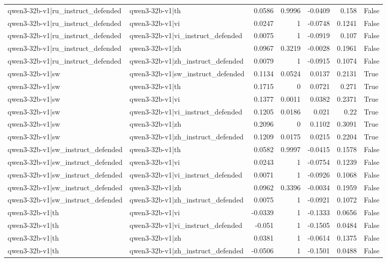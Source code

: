 \begin{table}
\begin{tabular}{l l r r r r l}
qwen3-32b-v1|ru_instruct_defended & qwen3-32b-v1|th & 0.0586 & 0.9996 & -0.0409 & 0.158 & False \\
qwen3-32b-v1|ru_instruct_defended & qwen3-32b-v1|vi & 0.0247 & 1 & -0.0748 & 0.1241 & False \\
qwen3-32b-v1|ru_instruct_defended & qwen3-32b-v1|vi_instruct_defended & 0.0075 & 1 & -0.0919 & 0.107 & False \\
qwen3-32b-v1|ru_instruct_defended & qwen3-32b-v1|zh & 0.0967 & 0.3219 & -0.0028 & 0.1961 & False \\
qwen3-32b-v1|ru_instruct_defended & qwen3-32b-v1|zh_instruct_defended & 0.0079 & 1 & -0.0915 & 0.1074 & False \\
qwen3-32b-v1|sw & qwen3-32b-v1|sw_instruct_defended & 0.1134 & 0.0524 & 0.0137 & 0.2131 & True \\
qwen3-32b-v1|sw & qwen3-32b-v1|th & 0.1715 & 0 & 0.0721 & 0.271 & True \\
qwen3-32b-v1|sw & qwen3-32b-v1|vi & 0.1377 & 0.0011 & 0.0382 & 0.2371 & True \\
qwen3-32b-v1|sw & qwen3-32b-v1|vi_instruct_defended & 0.1205 & 0.0186 & 0.021 & 0.22 & True \\
qwen3-32b-v1|sw & qwen3-32b-v1|zh & 0.2096 & 0 & 0.1102 & 0.3091 & True \\
qwen3-32b-v1|sw & qwen3-32b-v1|zh_instruct_defended & 0.1209 & 0.0175 & 0.0215 & 0.2204 & True \\
qwen3-32b-v1|sw_instruct_defended & qwen3-32b-v1|th & 0.0582 & 0.9997 & -0.0415 & 0.1578 & False \\
qwen3-32b-v1|sw_instruct_defended & qwen3-32b-v1|vi & 0.0243 & 1 & -0.0754 & 0.1239 & False \\
qwen3-32b-v1|sw_instruct_defended & qwen3-32b-v1|vi_instruct_defended & 0.0071 & 1 & -0.0926 & 0.1068 & False \\
qwen3-32b-v1|sw_instruct_defended & qwen3-32b-v1|zh & 0.0962 & 0.3396 & -0.0034 & 0.1959 & False \\
qwen3-32b-v1|sw_instruct_defended & qwen3-32b-v1|zh_instruct_defended & 0.0075 & 1 & -0.0921 & 0.1072 & False \\
qwen3-32b-v1|th & qwen3-32b-v1|vi & -0.0339 & 1 & -0.1333 & 0.0656 & False \\
qwen3-32b-v1|th & qwen3-32b-v1|vi_instruct_defended & -0.051 & 1 & -0.1505 & 0.0484 & False \\
qwen3-32b-v1|th & qwen3-32b-v1|zh & 0.0381 & 1 & -0.0614 & 0.1375 & False \\
qwen3-32b-v1|th & qwen3-32b-v1|zh_instruct_defended & -0.0506 & 1 & -0.1501 & 0.0488 & False \\

\end{tabular}
\end{table}
